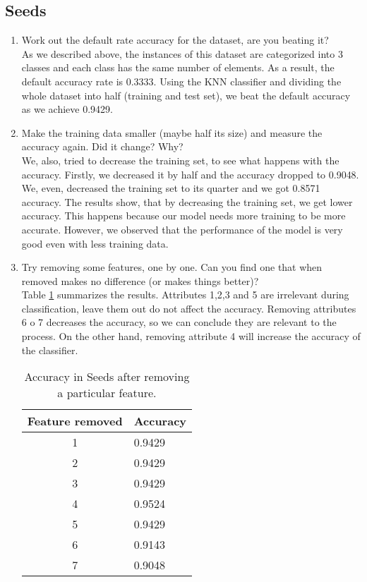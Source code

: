 \documentclass[10pt]{scrartcl}
\begin{document}
\subsection{Seeds}
\begin{enumerate}
 \item Work out the default rate accuracy for the dataset, are you beating it? \\
 As we described above, the instances of this dataset are categorized into 3 classes and each class has the same number of elements. As a result, the default accuracy rate is 0.3333. Using the KNN classifier and dividing the whole dataset into half (training and test set), we beat the default accuracy as we achieve 0.9429.
 
 \item Make the training data smaller (maybe half its size) and measure the accuracy again. Did it change? Why? \\ 
 We, also, tried to decrease the training set, to see what happens with the accuracy. Firstly, we decreased it by half and the accuracy dropped to 0.9048. We, even, decreased the training set to its quarter and we got 0.8571 accuracy. The results show, that by decreasing the training set, we get lower accuracy. This happens because our model needs more training to be more accurate. However, we observed that the performance of the model is very good even with less training data. 
 
 \item Try removing some features, one by one. Can you find one that when removed makes no difference (or makes things better)? \\
 Table \ref{tab:acc3} summarizes the results. Attributes 1,2,3 and 5 are irrelevant during classification, leave them out do not affect the accuracy. Removing attributes 6 o 7 decreases the accuracy, so we can conclude they are relevant to the process.  On the other hand, removing attribute 4 will increase the accuracy of the classifier.

 \begin{table}[h!]
 \centering
 \begin{tabular}{cl}
  \toprule
  \textbf{Feature removed} & \textbf{Accuracy} \\
  \midrule
  1  & 0.9429 \\ 
  2  & 0.9429 \\  
  3  & 0.9429 \\  
  4  & 0.9524 \\  
  5  & 0.9429 \\  
  6  & 0.9143 \\  
  7  & 0.9048 \\
  \bottomrule
 \end{tabular}
 \caption{Accuracy in Seeds after removing a particular feature.}\label{tab:acc3}
 \end{table}


\end{enumerate}
\end{document}
